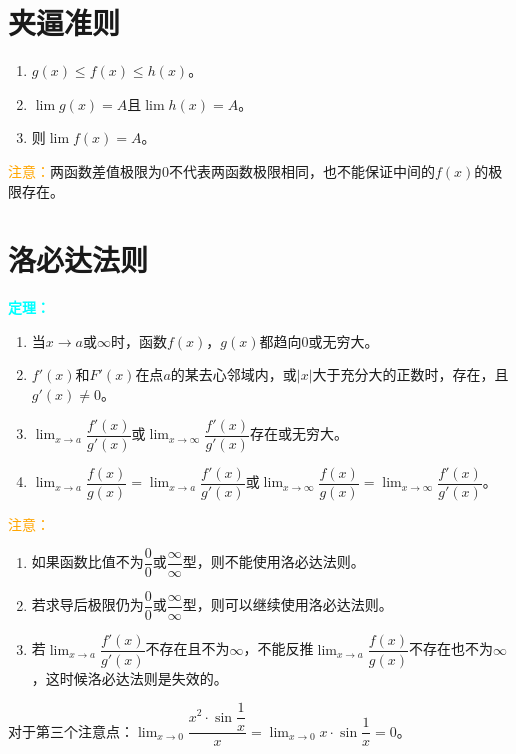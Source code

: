 \documentclass[UTF8]{ctexart}
\begin{document}
\section{夹逼准则}

\begin{enumerate}
    \item $g(x)\leqslant f(x)\leqslant h(x)$。
    \item $\lim g(x)=A$且$\lim h(x)=A$。
    \item 则$\lim f(x)=A$。
\end{enumerate}

\textcolor{orange}{注意：}两函数差值极限为0不代表两函数极限相同，也不能保证中间的$f(x)$的极限存在。

\section{洛必达法则}

\textcolor{aqua}{\textbf{定理：}}

\begin{enumerate}
    \item 当$x\to a\text{或}\infty$时，函数$f(x)$，$g(x)$都趋向0或无穷大。
    \item $f'(x)$和$F'(x)$在点$a$的某去心邻域内，或$\vert x\vert$大于充分大的正数时，存在，且$g'(x)\neq 0$。
    \item $\lim_{x\to a}\dfrac{f'(x)}{g'(x)}$或$\lim_{x\to\infty}\dfrac{f'(x)}{g'(x)}$存在或无穷大。
    \item $\lim_{x\to a}\dfrac{f(x)}{g(x)}=\lim_{x\to a}\dfrac{f'(x)}{g'(x)}$或$\lim_{x\to\infty}\dfrac{f(x)}{g(x)}=\lim_{x\to\infty}\dfrac{f'(x)}{g'(x)}$。
\end{enumerate}

\textcolor{orange}{注意：}

\begin{enumerate}
    \item 如果函数比值不为$\dfrac{0}{0}$或$\dfrac{\infty}{\infty}$型，则不能使用洛必达法则。
    \item 若求导后极限仍为$\dfrac{0}{0}$或$\dfrac{\infty}{\infty}$型，则可以继续使用洛必达法则。
    \item 若$\lim_{x\to a}\dfrac{f'(x)}{g'(x)}$不存在且不为$\infty$，不能反推$\lim_{x\to a}\dfrac{f(x)}{g(x)}$不存在也不为$\infty$，这时候洛必达法则是失效的。
\end{enumerate}

对于第三个注意点：$\lim_{x\to 0}\dfrac{x^2\cdot\sin\dfrac{1}{x}}{x}=\lim_{x\to 0}x\cdot\sin\dfrac{1}{x}=0$。
\end{document}
